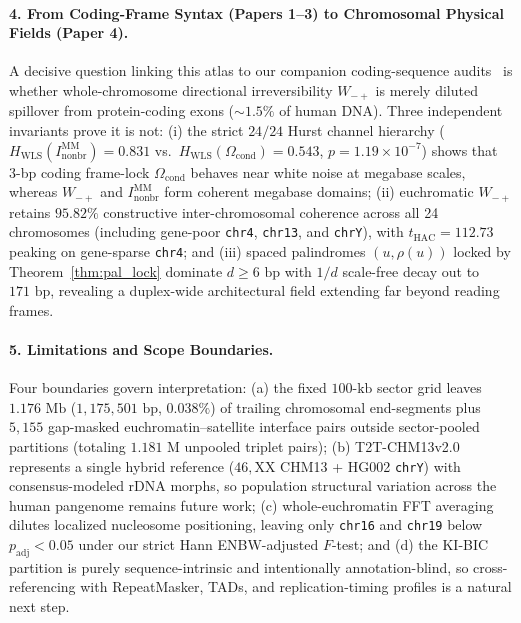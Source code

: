 \documentclass[11pt,a4paper]{article}
\newcommand{\Wmp}{W_{-+}}
\newcommand{\Inb}{I_{\mathrm{nonbr}}^{\mathrm{MM}}}
\begin{document}
\paragraph{4. From Coding-Frame Syntax (Papers 1--3) to Chromosomal Physical Fields (Paper 4).}
A decisive question linking this atlas to our companion coding-sequence audits~\cite{Logvinovich2026,Logvinovich2026b} is whether whole-chromosome directional irreversibility $\Wmp$ is merely diluted spillover from protein-coding exons ($\sim 1.5\%$ of human DNA). Three independent invariants prove it is not: (i) the strict $24/24$ Hurst channel hierarchy ($H_{\mathrm{WLS}}(\Inb)=0.831$ vs.\ $H_{\mathrm{WLS}}(\Omega_{\mathrm{cond}})=0.543$, $p=1.19\times 10^{-7}$) shows that 3-bp coding frame-lock $\Omega_{\mathrm{cond}}$ behaves near white noise at megabase scales, whereas $\Wmp$ and $\Inb$ form coherent megabase domains; (ii) euchromatic $\Wmp$ retains $95.82\%$ constructive inter-chromosomal coherence across all 24 chromosomes (including gene-poor \texttt{chr4}, \texttt{chr13}, and \texttt{chrY}), with $t_{\mathrm{HAC}}=112.73$ peaking on gene-sparse \texttt{chr4}; and (iii) spaced palindromes $(u,\rho(u))$ locked by Theorem~\ref{thm:pal_lock} dominate $d \ge 6\text{ bp}$ with $1/d$ scale-free decay out to $171\text{ bp}$, revealing a duplex-wide architectural field extending far beyond reading frames.

\paragraph{5. Limitations and Scope Boundaries.}
Four boundaries govern interpretation: (a) the fixed $100\text{-kb}$ sector grid leaves $1.176\text{ Mb}$ ($1{,}175{,}501\text{ bp}$, $0.038\%$) of trailing chromosomal end-segments plus $5{,}155$ gap-masked euchromatin--satellite interface pairs outside sector-pooled partitions (totaling $1.181\text{ M}$ unpooled triplet pairs); (b) T2T-CHM13v2.0 represents a single hybrid reference ($46,\mathrm{XX}$ CHM13 + HG002 \texttt{chrY}) with consensus-modeled rDNA morphs, so population structural variation across the human pangenome remains future work; (c) whole-euchromatin FFT averaging dilutes localized nucleosome positioning, leaving only \texttt{chr16} and \texttt{chr19} below $p_{\mathrm{adj}} < 0.05$ under our strict Hann ENBW-adjusted $F$-test; and (d) the KI-BIC partition is purely sequence-intrinsic and intentionally annotation-blind, so cross-referencing with RepeatMasker, TADs, and replication-timing profiles is a natural next step.
\end{document}
